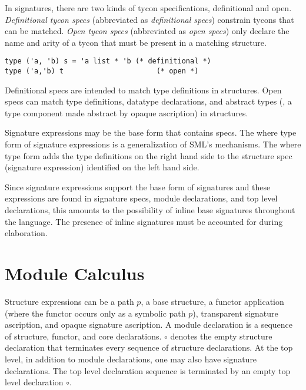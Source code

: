 In signatures, there are two kinds of tycon specifications, definitional and open. \emph{Definitional tycon specs} (abbreviated as \emph{definitional specs}) constrain tycons that can be matched. \emph{Open tycon specs} (abbreviated as \emph{open specs}) only declare the name and arity of a tycon that must be present in a matching structure.

\begin{singlespace}
\begin{lstlisting}
type ('a, 'b) s = 'a list * 'b (* definitional *)
type ('a,'b) t                      (* open *)
\end{lstlisting}
\end{singlespace}

Definitional specs are intended to match type definitions in structures. Open specs can match type definitions, datatype declarations, and abstract types (\ie, a type component made abstract by opaque ascription) in structures. 

Signature expressions may be the base form that contains specs. The where type form of signature expressions is a generalization of SML's mechanisms. The where type form adds the type definitions on the right hand side to the structure spec (signature expression) identified on the left hand side. 

Since signature expressions support the base form of signatures and these expressions are found in signature specs, module declarations, and top level declarations, this amounts to the possibility of inline base signatures throughout the language. The presence of inline signatures must be accounted for during elaboration. 


\section{Module Calculus}

Structure expressions can be a path $p$, a base structure, a functor
application (where the functor occurs only as a symbolic path $p$),
transparent signature ascription, and opaque signature ascription. A
module declaration is a sequence of structure, functor, and core
declarations. $\circ$ denotes the empty structure declaration that
terminates every sequence of structure declarations. At the top level,
in addition to module declarations, one may also have signature
declarations. The top level declaration sequence is terminated by an
empty top level declaration $\circ$. 

